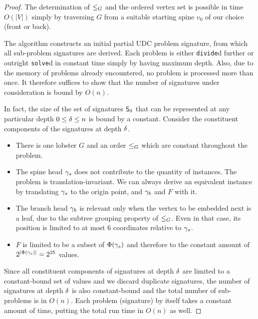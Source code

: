 \begin{proof}
The determination of $\leq_G$ and the ordered vertex set  is possible in time $O(|V|)$ simply by traversing $G$ from a suitable starting spine $v_0$ of our choice (front or back).

The algorithm constructs an initial partial UDC problem signature, from which all sub-problem signatures are derived. Each problem is either \texttt{divide}d further or outright \texttt{solve}d in constant time simply by having maximum depth. Also, due to the memory of problems already encountered, no problem is processed more than once. It therefore suffices to show that the number of signatures under consideration is bound by $O(n)$.

In fact, the size of the set of signatures $\DataSty{S}_\depth$ that can be represented at any particular depth $0 \leq \delta \leq n$ is bound by a constant. Consider the constituent components of the signatures at depth $\delta$.

\begin{itemize}
    \item There is one lobster $G$ and an order $\leq_G$ which are constant throughout the problem.
    \item The spine head $\gamma_s$ does not contribute to the quantity of instances. The problem is translation-invariant. We can always derive an equivalent instance by translating $\gamma_s$ to the origin point, and $\gamma_b$ and $F$ with it.
    \item The branch head $\gamma_b$ is relevant only when the vertex to be embedded next is a leaf, due to the subtree grouping property of $\leq_G$. Even in that case, its position is limited to at most 6 coordinates relative to $\gamma_s$.
    \item $F$ is limited to be a subset of $\Phi(\gamma_s)$ and therefore to the constant amount of $2^{|\Phi(\gamma_s)|} = 2^{25}$ values.
\end{itemize}

Since all constituent components of signatures at depth $\delta$ are limited to a constant-bound set of values and we discard duplicate signatures, the number of signatures at depth $\delta$ is also constant-bound and the total number of sub-problems is in $O(n)$. Each problem (signature) by itself takes a constant amount of time, putting the total run time in $O(n)$ as well.
\end{proof}

